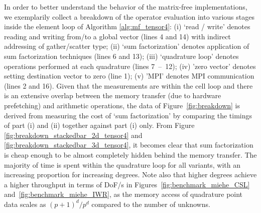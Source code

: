 \documentclass[AMA,STIX1COL]{WileyNJD-v2}
\begin{document}
In order to better understand the behavior of the matrix-free implementations,
we exemplarily collect a breakdown of the operator evaluation into various stages inside the element loop of Algorithm \ref{alg:mf_tensor4}:
(i) `read / write' denotes reading and writing from/to a global vector (lines 4 and 14) with indirect addressing of gather/scatter type;
(ii) `sum factorization' denotes application of sum factorization techniques (lines 6 and 13);
(iii) `quadrature loop' denotes operations performed at each quadrature (lines \mbox{7 -- 12});
(iv) 'zero vector' denotes setting destination vector to zero (line 1);
(v) 'MPI' denotes MPI communication (lines 2 and 16).
{\color{red}
Given that the measurements are within the cell loop and there is an extensive overlap between the memory transfer (due to hardware prefetching) and arithmetic operations, the data of Figure~\ref{fig:breakdown} is derived from measuring the cost of `sum factorization' by comparing the timings of part (i) and (ii) together against part (i) only.
From Figure \ref{fig:breakdown_stackedbar_2d_tensor4} and  \ref{fig:breakdown_stackedbar_3d_tensor4}, it becomes clear that sum factorization is cheap enough to be almost completely hidden behind the memory transfer.
The majority of time is spent within the quadrature loop for all variants, with an increasing proportion for increasing degrees. Note also that higher degrees achieve a higher throughput in terms of DoF/s in Figures~\ref{fig:benchmark_miehe_CSL} and~\ref{fig:benchmark_miehe_IWR}, as the memory access of quadrature point data scales as $(p+1)^d/p^d$ compared to the number of unknowns.
}
\end{document}
